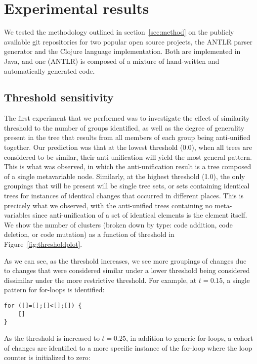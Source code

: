 \section{Experimental results}

We tested the methodology outlined in section~\ref{sec:method} on the
publicly available git repositories for two popular open source
projects, the ANTLR parser generator and the Clojure language implementation.
Both are implemented in Java, and one (ANTLR) is composed of a mixture of
hand-written and automatically generated code.  

\subsection{Threshold sensitivity}

The first experiment that we performed was to investigate the effect of
similarity threshold to the number of groups identified, as well as the degree
of generality present in the tree that results from all members of each group
being anti-unified together. Our prediction was that at the lowest threshold
(0.0), when all trees are considered to be similar, their anti-unification
will yield the most general pattern.  This is what was observed, in which the
anti-unification result is a tree composed of a single metavariable node.
Similarly, at the highest threshold (1.0), the only groupings that will be
present will be single tree sets, or sets containing identical trees for
instances of identical changes that occurred in different places.  This is
precicely what we observed, with the anti-unified trees containing no meta-
variables since anti-unification of a set of identical elements is the element
itself.  We show the number of clusters (broken down by type: code addition,
code deletion, or code mutation) as a function of threshold in
Figure~\ref{fig:thresholdplot}.

As we can see, as the threshold increases, we see more groupings of changes
due to changes that were considered similar under a lower threshold being
considered dissimilar under the more restrictive threshold.  For example, at
$t=0.15$, a single pattern for for-loops is identified:

\begin{verbatim}
for ([]=[];[]<[];[]) {
    []
}
\end{verbatim}

As the threshold is increased to $t=0.25$, in addition to generic for-loops, a
cohort of changes are identified to a more specific instance of the for-loop where
the loop counter is initialized to zero:

